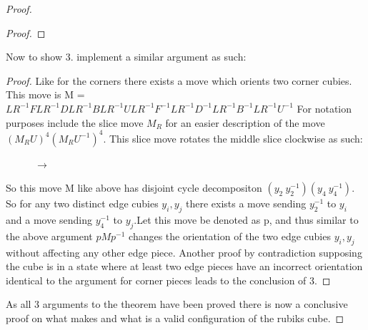 \documentclass{article}
\begin{document}
\begin{proof}
\begin{proof}
\end{proof}Now to show 3. implement a similar argument as such:
\begin{proof}
Like for the corners there exists a move which orients two corner cubies. This move is M = $LR^{-1}FLR^{-1}DLR^{-1}BLR^{-1}ULR^{-1}F^{-1}LR^{-1}D^{-1}LR^{-1}B^{-1}LR^{-1}U^{-1}$
\newline For notation purposes include the slice move $M_{R}$ for an easier description of the move $(M_{R}U)^{4}(M_{R}U^{-1})^{4}$. This slice move rotates the middle slice clockwise as such:
\begin{figure}[h]
\RubikCubeSolved%
%
%
\hspace{.5cm}
\hspace{1cm}$\longrightarrow$
\hspace{1cm}
%
\end{figure}
So this move M like above has disjoint cycle decompositon $(y_2\ y_2^{-1})(y_4\ y_4^{-1})$. So for any two distinct edge cubies $y_i, y_j$ there exists a move sending $y_2^{-1}$ to $y_i$ and a move sending $y_4^{-1}$ to $y_j$.Let this move be denoted as p, and thus similar to the above argument $pMp^{-1}$ changes the orientation of the two edge cubies $y_i, y_j$ without affecting any other edge piece. Another proof by contradiction supposing the cube is in a state where at least two edge pieces have an incorrect orientation identical to the argument for corner pieces leads to the conclusion of 3.
\end{proof}
As all 3 arguments to the theorem have been proved there is now a conclusive proof on what makes and what is a valid configuration of the rubiks cube.
\end{proof}
\end{document}
